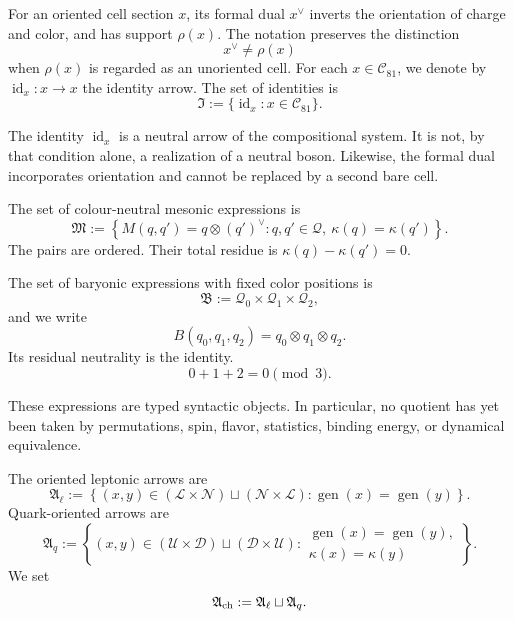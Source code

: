 \begin{definition}
\label{def:dual-identidad-composicional}
For an oriented cell section \(x\), its formal dual \(x^\vee\) inverts
the orientation of charge and color, and has support \(\rho(x)\). The
notation preserves the distinction
\[
 x^\vee\ne \rho(x)
\]
when \(\rho(x)\) is regarded as an unoriented cell. For each
\(x\in\mathcal C_{81}\), we denote by
\(\operatorname{id}_x:x\to x\) the identity arrow. The set of
identities is
\[
 \mathfrak I
 :=\{\operatorname{id}_x:x\in\mathcal C_{81}\}.
\]
\end{definition}

The identity \(\operatorname{id}_x\) is a neutral arrow of the compositional
system.
It is not, by that condition alone, a realization of a neutral boson. Likewise,
the formal dual incorporates orientation and cannot be replaced by a
second bare cell.

\begin{definition}
\label{def:expresiones-mesonicas-barionicas}
The set of colour-neutral mesonic expressions is
\[
 \mathfrak M
 :=
 \left\{
   M(q,q')=q\otimes{(q')}^\vee:
   q,q'\in\mathcal Q,\ \kappa(q)=\kappa(q')
 \right\}.
\]
The pairs are ordered. Their total residue is
\(\kappa(q)-\kappa(q')=0\).

The set of baryonic expressions with fixed color positions is
\[
 \mathfrak B
 :=
 \mathcal Q_0\times\mathcal Q_1\times\mathcal Q_2,
\]
and we write
\[
 B(q_0,q_1,q_2)=q_0\otimes q_1\otimes q_2.
\]
Its residual neutrality is the identity.
\[
 0+1+2=0\pmod3.
\]
\end{definition}

These expressions are typed syntactic objects. In particular, no
quotient has yet been taken by permutations, spin, flavor, statistics,
binding energy, or dynamical equivalence.

\begin{definition}
\label{def:flechas-cargadas-compatibles}
The oriented leptonic arrows are
\[
 \mathfrak A_\ell
 :=
 \left\{
 (x,y)\in
   (\mathcal L\times\mathcal N)
   \sqcup
   (\mathcal N\times\mathcal L):
 \operatorname{gen}(x)=\operatorname{gen}(y)
 \right\}.
\]
Quark-oriented arrows are
\[
 \mathfrak A_q
 :=
 \left\{
 (x,y)\in
   (\mathcal U\times\mathcal D)
   \sqcup
   (\mathcal D\times\mathcal U):
 \begin{array}{l}
 \operatorname{gen}(x)=\operatorname{gen}(y),\\[-2pt]
 \kappa(x)=\kappa(y)
 \end{array}
 \right\}.
\]
We set
\[
 \mathfrak A_{\rm ch}:=\mathfrak A_\ell\sqcup\mathfrak A_q.
\]
\end{definition}

